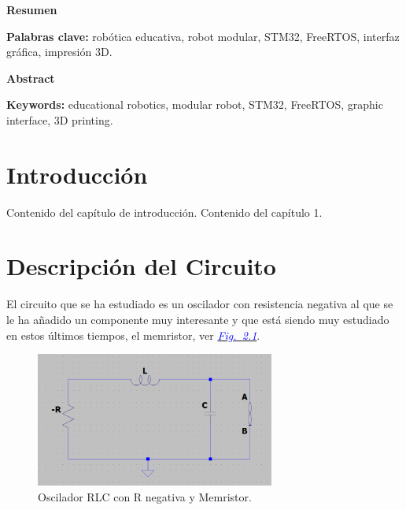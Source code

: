 \documentclass[12pt,a4paper]{report} %
\newcommand{\fref}[1]{\hyperref[#1]{\textcolor{blue}{\textit{Fig.~\ref*{#1}}}}}
\begin{document}
	\clearpage
	\null
	\thispagestyle{empty}
	\newpage

\begin{center}
	\LARGE\textbf{Resumen}
\end{center}
\begin{minipage}{\textwidth}
	\lipsum[1]
	
	\vspace{0.5cm}
	\noindent \textbf{Palabras clave:} robótica educativa, robot modular, STM32, FreeRTOS, interfaz gráfica, impresión 3D.
\end{minipage}

\vspace{1cm}

\begin{center}
	\LARGE\textbf{Abstract}
\end{center}
\begin{minipage}{\textwidth}
	\lipsum[2]
	
	\vspace{0.5cm}
	\noindent \textbf{Keywords:} educational robotics, modular robot, STM32, FreeRTOS, graphic interface, 3D printing.
\end{minipage}
\newpage
	
\tableofcontents
	\chapter{Introducción}
	Contenido del capítulo de introducción. Contenido del capítulo 1.
	
	\chapter{Descripción del Circuito}
	\noindent El circuito que se ha estudiado es un oscilador con resistencia negativa al que se le ha añadido un componente muy interesante y que está siendo muy estudiado en estos últimos tiempos, el memristor, ver \fref{fig:-RLCM}.
	
	\begin{figure}[h]
		\centering
		\includegraphics[width=0.7\textwidth]{-RLCM.png}
		\caption{Oscilador RLC con R negativa y Memristor.}
		\label{fig:-RLCM}
	\end{figure}
	
\end{document}
